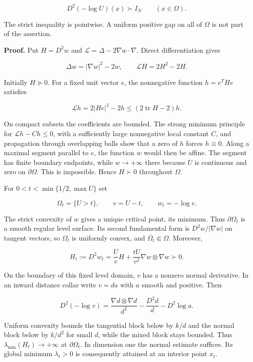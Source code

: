 \documentclass[11pt]{article}
\begin{document}
\[D^2(-\log U)(x)\succ I_N\qquad(x\in\Omega).\tag{8.1}\]

The strict inequality is pointwise. A uniform positive gap on all of
\(\Omega\) is not part of the assertion.

\textbf{Proof.} Put \(H=D^2w\) and
\(\mathcal L=\Delta-2\nabla w\cdot\nabla\). Direct differentiation gives

\[\Delta w=|\nabla w|^2-2w,\qquad \mathcal L H=2H^2-2H.\tag{8.2}\]

Initially \(H\succeq0\). For a fixed unit vector \(e\), the nonnegative
function \(h=e^THe\) satisfies

\[\mathcal Lh=2|He|^2-2h\leq(2\operatorname{tr}H-2)h.\]

On compact subsets the coefficients are bounded. The strong minimum
principle for \(\mathcal Lh-Ch\leq0\), with a sufficiently large
nonnegative local constant \(C\), and propagation through overlapping
balls show that a zero of \(h\) forces \(h\equiv0\). Along a maximal
segment parallel to \(e\), the function \(w\) would then be affine. The
segment has finite boundary endpoints, while \(w\to+\infty\) there
because \(U\) is continuous and zero on \(\partial\Omega\). This is
impossible. Hence \(H\succ0\) throughout \(\Omega\).

For \(0<t<\min\{1/2,\max U\}\) set

\[\Omega_t=\{U>t\},\qquad v=U-t,\qquad w_t=-\log v.\]

The strict convexity of \(w\) gives a unique critical point, its
minimum. Thus \(\partial\Omega_t\) is a smooth regular level surface.
Its second fundamental form is \(D^2w/|\nabla w|\) on tangent vectors,
so \(\Omega_t\) is uniformly convex, and
\(\overline{\Omega_t}\Subset\Omega\). Moreover,

\[H_t:=D^2w_t=\frac{U}{v}H+\frac{tU}{v^2}\nabla w\otimes\nabla w\succ0.\tag{8.3}\]

On the boundary of this fixed level domain, \(v\) has a nonzero normal
derivative. In an inward distance collar write \(v=d a\) with \(a\)
smooth and positive. Then

\[D^2(-\log v)=\frac{\nabla d\otimes\nabla d}{d^2}-\frac{D^2d}{d}-D^2\log a.\]

Uniform convexity bounds the tangential block below by \(k/d\) and the
normal block below by \(k/d^2\) for small \(d\), while the mixed block
stays bounded. Thus \(\lambda_{\min}(H_t)\to+\infty\) at
\(\partial\Omega_t\). In dimension one the normal estimate suffices. Its
global minimum \(\lambda_t>0\) is consequently attained at an interior
point \(x_t\).
\end{document}
